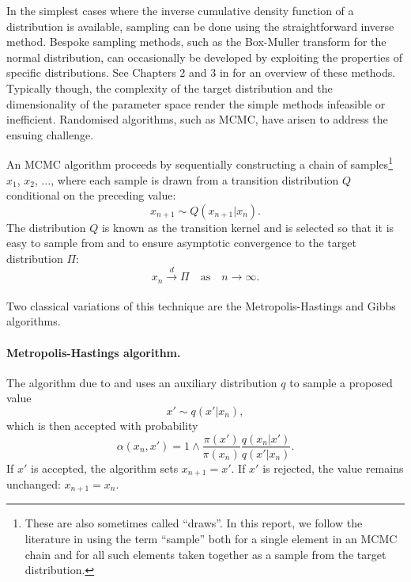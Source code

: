 \documentclass[11pt,a4paper]{report}
\begin{document}
In the simplest cases where the inverse cumulative density function of a distribution is available, sampling can be done using the straightforward inverse method. Bespoke sampling methods, such as the Box-Muller transform for the normal distribution, can occasionally be developed by exploiting the properties of specific distributions. See Chapters 2 and 3 in \cite{robertMonteCarloStatistical2004} for an overview of these methods. Typically though, the complexity of the target distribution and the dimensionality of the parameter space render the simple methods infeasible or inefficient. Randomised algorithms, such as MCMC, have arisen to address the ensuing challenge.


An MCMC algorithm proceeds by sequentially constructing a chain of samples\footnote{These are also sometimes called ``draws''. In this report, we follow the literature in using the term ``sample'' both for a single element in an MCMC chain and for all such elements taken together as a sample from the target distribution.} $x_1$, $x_2$, $\dots$,  where each sample is drawn from a transition distribution $Q$ conditional on the preceding value:
$$x_{n+1} \sim Q(x_{n+1}|x_n).$$
The distribution $Q$ is known as the transition kernel and is selected so that it is easy to sample from and to ensure asymptotic convergence to the target distribution $\Pi$:
$$x_n \xrightarrow[]{d} \Pi \quad\text{as}\quad n \to \infty.$$

Two classical variations of this technique are the Metropolis-Hastings and Gibbs algorithms.

\paragraph{Metropolis-Hastings algorithm.} The algorithm due to \cite{metropolisEquationStateCalculations1953} and \cite{hastingsMonteCarloSampling1970} uses an auxiliary distribution $q$ to sample a proposed value
$$x' \sim q(x' | x_n),$$
which is then accepted with probability
$$\alpha(x_n, x') = 1 \wedge \frac{\pi(x')}{\pi(x_n)} \frac{q(x_n|x')}{q(x'|x_n)}.$$
If $x'$ is accepted, the algorithm sets $x_{n+1} = x'$. If $x'$ is rejected, the value remains unchanged: $x_{n+1} = x_n$.

\end{document}
